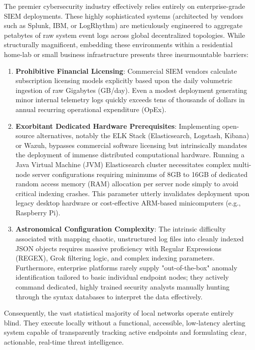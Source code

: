 The premier cybersecurity industry effectively relies entirely on enterprise-grade SIEM deployments. These highly sophisticated systems (architected by vendors such as Splunk, IBM, or LogRhythm) are meticulously engineered to aggregate petabytes of raw system event logs across global decentralized topologies. While structurally magnificent, embedding these environments within a residential home-lab or small business infrastructure presents three insurmountable barriers:

\begin{enumerate}
    \item \textbf{Prohibitive Financial Licensing}: Commercial SIEM vendors calculate subscription licensing models explicitly based upon the daily volumetric ingestion of raw Gigabytes (GB/day). Even a modest deployment generating minor internal telemetry logs quickly exceeds tens of thousands of dollars in annual recurring operational expenditure (OpEx).
    \item \textbf{Exorbitant Dedicated Hardware Prerequisites}: Implementing open-source alternatives, notably the ELK Stack (Elasticsearch, Logstash, Kibana) or Wazuh, bypasses commercial software licensing but intrinsically mandates the deployment of immense distributed computational hardware. Running a Java Virtual Machine (JVM) Elasticsearch cluster necessitates complex multi-node server configurations requiring minimums of 8GB to 16GB of dedicated random access memory (RAM) allocation per server node simply to avoid critical indexing crashes. This parameter utterly invalidates deployment upon legacy desktop hardware or cost-effective ARM-based minicomputers (e.g., Raspberry Pi).
    \item \textbf{Astronomical Configuration Complexity}: The intrinsic difficulty associated with mapping chaotic, unstructured log files into cleanly indexed JSON objects requires massive proficiency with Regular Expressions (REGEX), Grok filtering logic, and complex indexing parameters. Furthermore, enterprise platforms rarely supply "out-of-the-box" anomaly identification tailored to basic individual endpoint nodes; they actively command dedicated, highly trained security analysts manually hunting through the syntax databases to interpret the data effectively.
\end{enumerate}

Consequently, the vast statistical majority of local networks operate entirely blind. They execute locally without a functional, accessible, low-latency alerting system capable of transparently tracking active endpoints and formulating clear, actionable, real-time threat intelligence.

